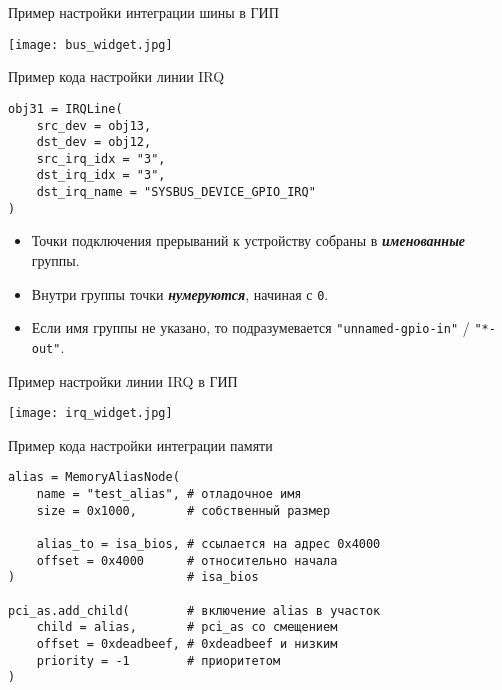 \documentclass[unicode,hyperref={unicode=true}]{beamer}
\theoremstyle{definition}
\theoremstyle{plain}
\begin{document}
\begin{frame}{Пример настройки интеграции шины в ГИП}
\begin{center}
\texttt{[image: bus\_widget.jpg]}
\end{center}
\end{frame}



\begin{frame}[fragile]{Пример кода настройки линии IRQ}
\lstset{language=Python}
\begin{lstlisting}
obj31 = IRQLine(
    src_dev = obj13,
    dst_dev = obj12,
    src_irq_idx = "3",
    dst_irq_idx = "3",
    dst_irq_name = "SYSBUS_DEVICE_GPIO_IRQ"
)
\end{lstlisting}
\vfill
\begin{itemize}
\item Точки подключения прерываний к устройству собраны в
\textit{\textbf{именованные}}
группы.
\item Внутри группы точки \textit{\textbf{нумеруются}}, начиная с \texttt{0}.
\item Если имя группы не указано, то подразумевается
\texttt{"unnamed-gpio-in"} / \texttt{"*-out"}.
\end{itemize}
\end{frame}



\begin{frame}{Пример настройки линии IRQ в ГИП}
\begin{center}
\texttt{[image: irq\_widget.jpg]}
\end{center}
\end{frame}



\begin{frame}[fragile]{Пример кода настройки интеграции памяти}
\lstset{language=Python}
\begin{lstlisting}
alias = MemoryAliasNode(
    name = "test_alias", # отладочное имя
    size = 0x1000,       # собственный размер

    alias_to = isa_bios, # ссылается на адрес 0x4000
    offset = 0x4000      # относительно начала
)                        # isa_bios

pci_as.add_child(        # включение alias в участок
    child = alias,       # pci_as со смещением
    offset = 0xdeadbeef, # 0xdeadbeef и низким
    priority = -1        # приоритетом
)
\end{lstlisting}
\end{frame}
\end{document}
